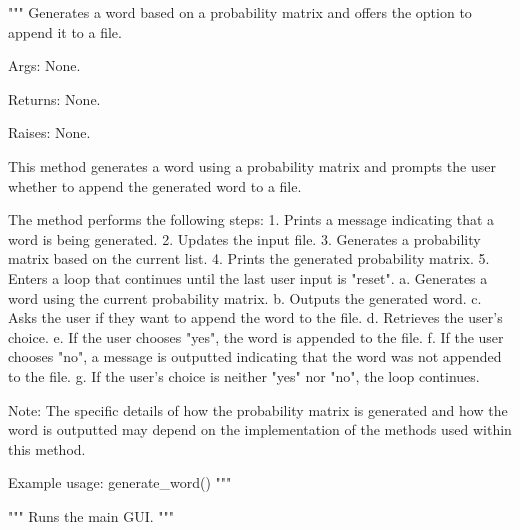 \begin{codebox}
"""
Generates a word based on a probability matrix and offers the option to append it to a file.

Args:
    None.

Returns:
    None.

Raises:
    None.

This method generates a word using a probability matrix and prompts the user whether to append the generated word
to a file.

The method performs the following steps:
	1. Prints a message indicating that a word is being generated.
	2. Updates the input file.
	3. Generates a probability matrix based on the current list.
	4. Prints the generated probability matrix.
	5. Enters a loop that continues until the last user input is "reset".
	    a. Generates a word using the current probability matrix.
	    b. Outputs the generated word.
	    c. Asks the user if they want to append the word to the file.
	    d. Retrieves the user's choice.
	    e. If the user chooses "yes", the word is appended to the file.
	    f. If the user chooses "no", a message is outputted indicating that the word was not appended to the file.
	    g. If the user's choice is neither "yes" nor "no", the loop continues.

Note: The specific details of how the probability matrix is generated and how the word is outputted may depend on
the implementation of the methods used within this method.

Example usage:
    generate_word()
"""
\end{codebox}

\begin{codebox}
"""
Runs the main GUI.
"""
\end{codebox}
